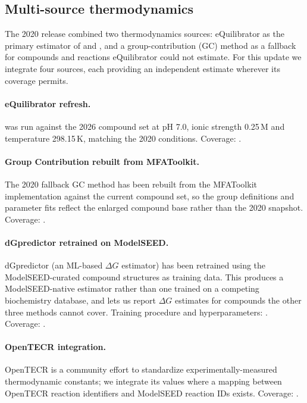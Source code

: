 \subsection{Multi-source thermodynamics}\label{sec:methods-thermo}

The 2020 release combined two thermodynamics sources: eQuilibrator as the
primary estimator of \dfG{} and \drG{}, and a group-contribution (GC) method as
a fallback for compounds and reactions eQuilibrator could not estimate. For this
update we integrate four sources, each providing an independent estimate
wherever its coverage permits.

\paragraph{eQuilibrator refresh.}  was run against
the 2026 compound set at pH 7.0, ionic strength 0.25\,M and temperature
298.15\,K, matching the 2020 conditions. Coverage: .

\paragraph{Group Contribution rebuilt from MFAToolkit.} The 2020 fallback GC
method has been rebuilt from the MFAToolkit implementation against the current
compound set, so the group definitions and parameter fits reflect the enlarged
compound base rather than the 2020 snapshot. Coverage: \TBD{}.

\paragraph{dGpredictor retrained on ModelSEED.} dGpredictor (an ML-based
$\Delta G$ estimator) has been retrained using the ModelSEED-curated compound
structures as training data. This produces a ModelSEED-native estimator rather
than one trained on a competing biochemistry database, and lets us report
$\Delta G$ estimates for compounds the other three methods cannot cover.
Training procedure and hyperparameters: \TBD{}. Coverage: \TBD{}.

\paragraph{OpenTECR integration.} OpenTECR is a community effort to standardize
experimentally-measured thermodynamic constants; we integrate its values where a
mapping between OpenTECR reaction identifiers and ModelSEED reaction IDs exists.
Coverage: \TBD{}.

